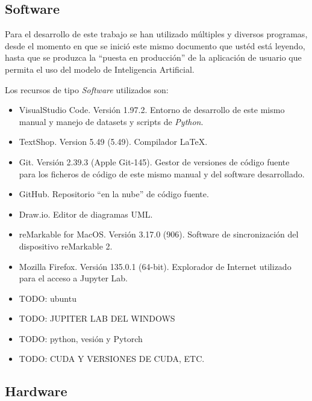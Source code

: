 %


\subsection{Software}

Para el desarrollo de este trabajo se han utilizado múltiples y diversos programas, desde el momento en que se inició este mismo documento que ustéd está leyendo, hasta que se produzca la ``puesta en producción'' de la aplicación de usuario que permita el uso del modelo de Inteligencia Artificial.

Los recursos de tipo \emph{Software} utilizados son:

\begin{itemize}
    \item VisualStudio Code. Versión 1.97.2. Entorno de desarrollo de este mismo manual y manejo de datasets y scripts de \emph{Python}.
    \item TextShop. Version 5.49 (5.49). Compilador \LaTeX.
    \item Git. Versión 2.39.3 (Apple Git-145). Gestor de versiones de código fuente para los ficheros de código de este mismo manual y del software desarrollado.
    \item GitHub. Repositorio ``en la nube'' de código fuente.
    \item Draw.io. Editor de diagramas UML.
    \item reMarkable for MacOS. Versión 3.17.0 (906). Software de sincronización del dispositivo reMarkable 2.
    \item Mozilla Firefox. Versión 135.0.1 (64-bit). Explorador de Internet utilizado para el acceso a Jupyter Lab.
    \item TODO: ubuntu
    \item TODO: JUPITER LAB DEL WINDOWS
    \item TODO: python, vesión y Pytorch
    \item TODO: CUDA Y VERSIONES DE CUDA, ETC.
\end{itemize}

\subsection{Hardware}

